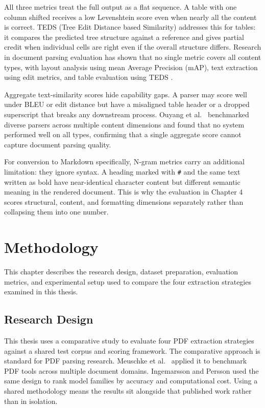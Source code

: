 \documentclass[12pt]{article}
\begin{document}
All three metrics treat the full output as a flat sequence. A table with one
column shifted receives a low Levenshtein score even when nearly all the content
is correct. TEDS (Tree Edit Distance based Similarity) addresses this for tables:
it compares the predicted tree structure against a reference and gives partial
credit when individual cells are right even if the overall structure differs.
Research in document parsing evaluation has shown that no single metric covers
all content types, with layout analysis using mean Average Precision (mAP), text
extraction using edit metrics, and table evaluation using TEDS
\cite{zhong2020, pfitzmann2022}.

Aggregate text-similarity scores hide capability gaps. A parser may score well
under BLEU or edit distance but have a misaligned table header or a dropped
superscript that breaks any downstream process. Ouyang et al.\
\cite{omnidocbench2025} benchmarked diverse parsers across multiple content
dimensions and found that no system performed well on all types, confirming
that a single aggregate score cannot capture document parsing quality.

For conversion to Markdown specifically, N-gram metrics carry an additional
limitation: they ignore syntax. A heading marked with \texttt{\#} and the same
text written as bold have near-identical character content but different semantic
meaning in the rendered document. This is why the evaluation in Chapter 4 scores
structural, content, and formatting dimensions separately rather than collapsing
them into one number.

\section{Methodology}

This chapter describes the research design, dataset preparation, evaluation metrics, and experimental setup used to compare the four extraction strategies examined in this thesis.

\subsection{Research Design}

This thesis uses a comparative study to evaluate four PDF extraction strategies
against a shared test corpus and scoring framework. The comparative approach is
standard for PDF parsing research. Meuschke et al.\ \cite{meuschke2023}
applied it to benchmark PDF tools across multiple document domains. Ingemarsson
and Persson \cite{ingemarsson2024} used the same design to rank model families
by accuracy and computational cost. Using a shared methodology means the results
sit alongside that published work rather than in isolation.
\end{document}
